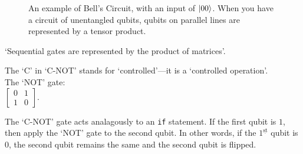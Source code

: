 \begin{figure}[ht]
    \caption{An example of Bell's Circuit, with an input of $\lvert00\rangle$. When you have a circuit of unentangled qubits, qubits on parallel lines are represented by a tensor product.}\label{fig:lec11fig1}
\end{figure}

`Sequential gates are represented by the product of matrices'.

The `C' in `C-NOT' stands for `controlled'---it is a `controlled operation'.\\
The `NOT' gate:\\
$\begin{bmatrix}
    0 & 1\\
    1 & 0
\end{bmatrix}$.\\
\begin{claim}
    The `C-NOT' gate acts analagously to an \verb+if+ statement. If the first qubit is $1$, then apply the `NOT' gate to the second qubit. In other words, if the $1^{\underline{\text{st}}}$ qubit is $0$, the second qubit remains the same and the second qubit is flipped.
\end{claim}

